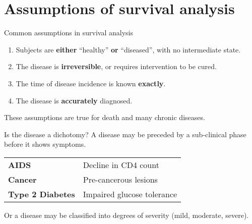 \section{Assumptions of survival analysis}

\begin{frame}{Common assumptions in survival analysis}
    \begin{enumerate}
      \item Subjects are \textbf{either} ``healthy'' \textbf{or} ``diseased'', with
	no intermediate state.
      \item The disease is \textbf{irreversible}, or requires intervention
	to be cured.
      \item The time of disease incidence is known \textbf{exactly}.
      \item The disease is \textbf{accurately} diagnosed.
    \end{enumerate}
    \pause
    These assumptions are true for \alert{death} and many
    \alert{chronic diseases}.
\end{frame}

\begin{frame}{Is the disease a dichotomy?}
  A disease may be preceded by a \alert{sub-clinical} phase before it shows
  symptoms.
  \pause
  \begin{center}
    \begin{tabular}{ll}
      {\bf AIDS} & Decline in CD4 count \\
      {\bf Cancer} & Pre-cancerous lesions \\
      {\bf Type 2 Diabetes} & Impaired glucose tolerance \\
    \end{tabular}
  \end{center}
  \pause
  Or a disease may be classified into \alert{degrees of severity}
  (mild, moderate, severe).
\end{frame}


